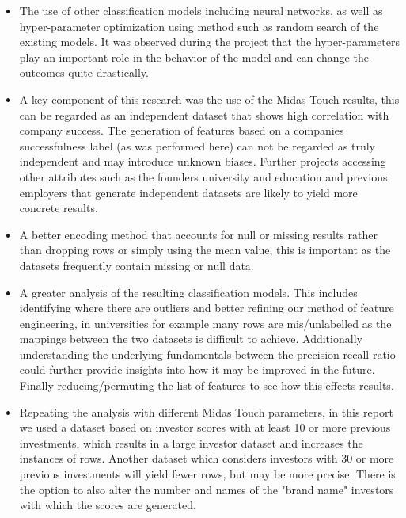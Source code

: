 \documentclass{article}
\begin{document}
\begin{itemize}

	\item The use of other classification models including neural networks, as well as hyper-parameter optimization using method such as random search of the existing models. It was observed during the project that the hyper-parameters play an important role in the behavior of the model and can change the outcomes quite drastically.
	
	\item A key component of this research was the use of the Midas Touch results, this can be regarded as an independent dataset that shows high correlation with company success. The generation of features based on a companies successfulness label (as was performed here) can not be regarded as truly independent and may introduce unknown biases. Further projects accessing other attributes such as the founders university and education and previous employers that generate independent datasets are likely to yield more concrete results.
	
	\item A better encoding method that accounts for null or missing results rather than dropping rows or simply using the mean value, this is important as the datasets frequently contain missing or null data. 
	
	\item A greater analysis of the resulting classification models. This includes identifying where there are outliers and better refining our method of feature engineering, in universities for example many rows are mis/unlabelled as the mappings between the two datasets is difficult to achieve. Additionally understanding the underlying fundamentals between the precision recall ratio could further provide insights into how it may be improved in the future. Finally reducing/permuting the list of features to see how this effects results.
	
	\item Repeating the analysis with different Midas Touch parameters, in this report we used a dataset based on investor scores with at least 10 or more previous investments, which results in a large investor dataset and increases the instances of rows. Another dataset which considers investors with 30 or more previous investments will yield fewer rows, but may be more precise. There is the option to also alter the number and names of the "brand name" investors with which the scores are generated.
	
\end{itemize}
\end{document}
